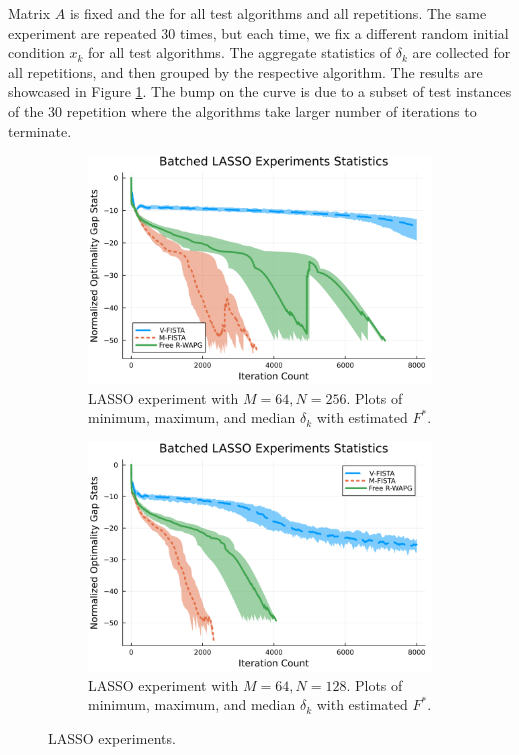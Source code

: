 \documentclass[12pt]{article}
\begin{document}
        Matrix $A$ is fixed and the for all test algorithms and all repetitions. 
        The same experiment are repeated 30 times, but each time, we fix a different random initial condition $x_k$ for all test algorithms. 
        The aggregate statistics of $\delta_k$ are collected for all repetitions, and then grouped by the respective algorithm. 
        The results are showcased in Figure \ref{fig:batched-lasso}. 
        The bump on the curve is due to a subset of test instances of the 30 repetition where the algorithms take larger number of iterations to terminate. 
        \begin{figure}[H]
            \begin{subfigure}[b]{0.47\textwidth}
                \centering
                \includegraphics[width=\textwidth]{assets/lasso_batched_statistics_64-256.png}
                \caption{LASSO experiment with $M = 64, N = 256$. Plots of minimum, maximum, and median $\delta_k$ with estimated $F^*$. }
            \end{subfigure}
            \hfill
            \begin{subfigure}[b]{0.47\textwidth}
                \centering
                \includegraphics[width=\textwidth]{assets/lasso_batched_statistics_64-128.png}
                \caption{LASSO experiment with $M = 64, N = 128$. Plots of minimum, maximum, and median $\delta_k$ with estimated $F^*$. }
            \end{subfigure}
            \caption{LASSO experiments. }
            \label{fig:batched-lasso}
        \end{figure}
\end{document}
